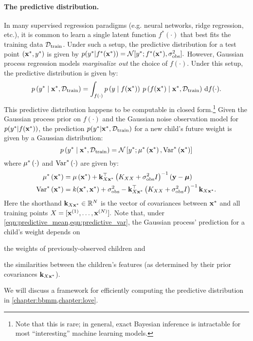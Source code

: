 \paragraph{The predictive distribution.}
In many supervised regression paradigms (e.g. neural networks, ridge regression, etc.), it is common to learn a single latent function $f^*(\cdot)$ that best fits the training data $\mathcal D_\text{train}$.
Under such a setup, the predictive distribution for a test point $(\mathbf{x}^*, y^*)$ is given by
$ p(\ytest \vert f^*(\bxtest)) = \normaldist{ \ytest; f^*(\bxtest) }{ \sigma^2_\text{obs} }. $
However, Gaussian process regression models \emph{marginalize out} the choice of $f(\cdot)$.
Under this setup, the predictive distribution is given by:
\begin{equation*}
  p \left( y^* \mid \mathbf{x}^*, \mathcal D_\text{train} \right)
  = \int_{f(\cdot)} p\left( y \mid f(\mathbf{x}^*) \right) \: p\left( f(\mathbf{x}^*) \mid \mathbf{x}^*, \mathcal D_\text{train} \right)
  \,\mathrm{d}{f}(\cdot).
\end{equation*}
%
This predictive distribution happens to be computable in closed form.\footnote{
  Note that this is rare; in general, exact Bayesian inference is intractable for most ``interesting'' machine learning models.
}
Given the Gaussian process prior on $f(\cdot)$ and the Gaussian noise observation model for $p(y^* \vert f(\mathbf{x}^*))$, the prediction $p(y^* \vert \mathbf{x}^*, \mathcal D_\text{train})$ for a new child's future weight is given by a Gaussian distribution:
%
\begin{equation}
  p \left(
    \ytest \mid \bxtest, \dset_\text{train}
  \right)
  = \normaldist{ \ytest ; \meantest{\bxtest}}{ \vartest{\bxtest} }
  \label{eqn:predictive}
\end{equation}
%
where $\mu^* \left( \cdot \right)$ and $\text{Var}^* \left( \cdot \right)$ are given by:
%
\begin{align}
  \mu^* \left( \mathbf{x}^* \right)
  &= \mu\left( \mathbf{x}^* \right) + \mathbf{k}_{X \mathbf{x}^*}^\top \left( K_{XX} + \sigma_\text{obs}^2 I \right)^{-1} \left( \mathbf{y} - \boldsymbol{\mu} \right)
  \label{eqn:predictive_mean}
  \\
  \text{Var}^* \left( \mathbf{x}^* \right)
  &= k ( \mathbf{x}^*, \mathbf{x}^*) + \sigma^2_\text{obs} - \mathbf{k}_{X \mathbf{x}^*}^\top \left( K_{XX} + \sigma_\text{obs}^2 I \right)^{-1} \mathbf{k}_{X \mathbf{x}^*}.
  \label{eqn:predictive_var}
\end{align}
%
Here the shorthand $\mathbf{k}_{X \mathbf{x}^*} \in \mathbb{R}^N$ is the vector of covariances between $\mathbf{x}^*$ and all training points $X = [\mathbf{x}^{(1)}, \ldots, \mathbf{x}^{(N)}].$
Note that, under \cref{eqn:predictive_mean,eqn:predictive_var}, the Gaussian process' prediction for a child's weight depends on
\begin{enumerate*}
  \item the weights of previously-observed children and
  \item the similarities between the children's features (as determined by their prior covariances $\mathbf{k}_{X \mathbf{x}^*}$).
\end{enumerate*}
We will discuss a framework for efficiently computing the predictive distribution in \cref{chapter:bbmm,chapter:love}.

